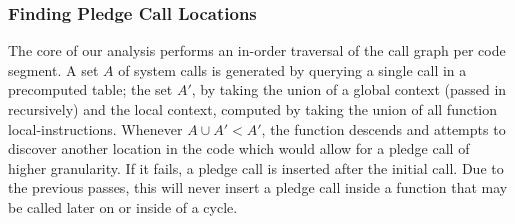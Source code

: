 \subsubsection{Finding Pledge Call Locations }

The core of our analysis performs an in-order traversal of the call graph per code segment. A set \(A\) of system calls is generated by querying a single call in a precomputed table; the set \(A'\), by taking the union of a global context (passed in recursively) and the local context, computed by taking the union of all function local-instructions. Whenever \(A \cup A' < A'\), the function descends and attempts to discover another location in the code which would allow for a pledge call of higher granularity. If it fails, a pledge call is inserted after the initial call. Due to the previous passes, this will never insert a pledge call inside a function that may be called later on or inside of a cycle.